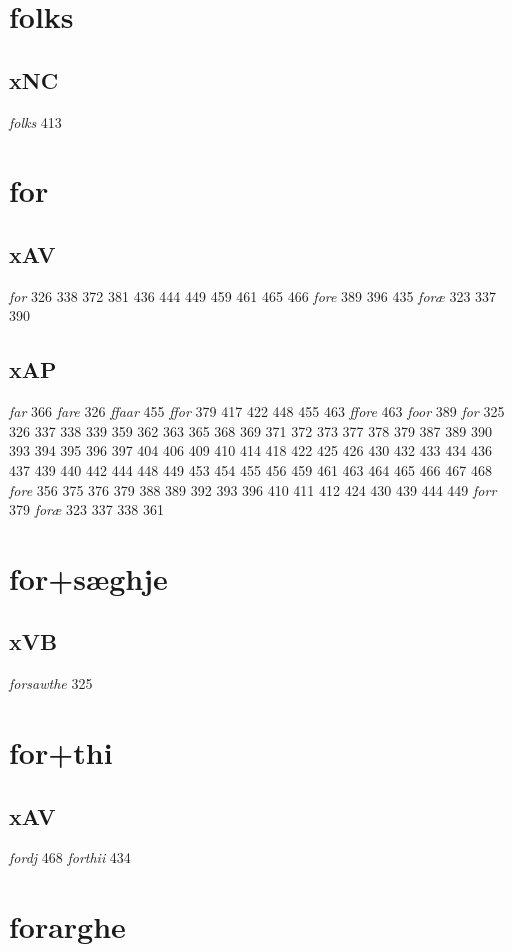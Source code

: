 \documentclass[a4paper,twocolumn]{article}
\begin{document}
\section{folks}
\label{sec:orga94d702}
\subsection{xNC}
\label{sec:orgcd573af}
\emph{folks} 413 
\section{for}
\label{sec:org443408c}
\subsection{xAV}
\label{sec:org6b4d801}
\emph{for} 326 338 372 381 436 444 449 459 461 465 466 \emph{fore} 389 396 435 \emph{foræ} 323 337 390 
\subsection{xAP}
\label{sec:orgc2c9f13}
\emph{far} 366 \emph{fare} 326 \emph{ffaar} 455 \emph{ffor} 379 417 422 448 455 463 \emph{ffore} 463 \emph{foor} 389 \emph{for} 325 326 337 338 339 359 362 363 365 368 369 371 372 373 377 378 379 387 389 390 393 394 395 396 397 404 406 409 410 414 418 422 425 426 430 432 433 434 436 437 439 440 442 444 448 449 453 454 455 456 459 461 463 464 465 466 467 468 \emph{fore} 356 375 376 379 388 389 392 393 396 410 411 412 424 430 439 444 449 \emph{forr} 379 \emph{foræ} 323 337 338 361 
\section{for+sæghje}
\label{sec:org7b99167}
\subsection{xVB}
\label{sec:orgb6ac7f4}
\emph{forsawthe} 325 
\section{for+thi}
\label{sec:orgc88f424}
\subsection{xAV}
\label{sec:org1274fb5}
\emph{fordj} 468 \emph{forthii} 434 
\section{forarghe}
\label{sec:org4110ec8}
\end{document}
